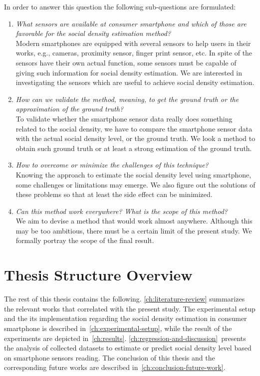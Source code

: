 In order to answer this question the following sub-questions are formulated:
\begin{enumerate}
	\item \textit{What sensors are available at consumer smartphone and which of those are favorable for the social density estimation method?}\\
	Modern smartphones are equipped with several sensors to help users in their works, e.g., cameras, proximity sensor, finger print sensor, etc. In spite of the sensors have their own actual function, some sensors must be capable of giving such information for social density estimation. We are interested in investigating the sensors which are useful to achieve social density estimation.

	\item \textit{How can we validate the method, meaning, to get the ground truth or the approximation of the ground truth?}\\
	To validate whether the smartphone sensor data really does something related to the social density, we have to compare the smartphone sensor data with the actual social density level, or the ground truth. We look a method to obtain such ground truth or at least a strong estimation of the ground truth.

	\item \textit{How to overcome or minimize the challenges of this technique?}\\
	Knowing the approach to estimate the social density level using smartphone, some challenges or limitations may emerge. We also figure out the solutions of these problems so that at least the side effect can be minimized.

	\item \textit{Can this method work everywhere? What is the scope of this method?}\\
	We aim to devise a method that would work almost anywhere. Although this may be too ambitious, there must be a certain limit of the present study. We formally portray the scope of the final result.
\end{enumerate}





\section{Thesis Structure Overview} %
\label{sec:thesis_overview}
The rest of this thesis contains the following.
\autoref{ch:literature-review} summarizes the relevant works that correlated with the present study. The experimental setup and the its implementation regarding the social density estimation in consumer smartphone is described in~\autoref{ch:experimental-setup}, while the result of the experiments are depicted in~\autoref{ch:results}. \autoref{ch:regression-and-discussion}~presents the analysis of collected datasets to estimate or predict social density level based on smartphone sensors reading. The conclusion of this thesis and the corresponding future works are described in~\autoref{ch:conclusion-future-work}.





